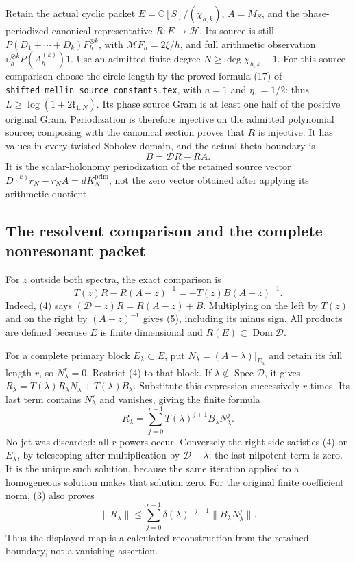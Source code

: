 Retain the actual cyclic packet
\(E=\mathbb C[S]/(\chi_{h,k})\), \(A=M_S\), and the
phase-periodized canonical representative \(R:E\to\mathscr H\).
Its source is still
\(P(D_1+\cdots+D_k)F_h^{\otimes k}\), with
\(\mathcal MF_h=2\xi/h\), and full arithmetic observation
\(\upsilon_h^{\otimes k}P(A_h^{(k)})1\).
Use an admitted finite degree \(N\ge\deg\chi_{h,k}-1\). For this
source comparison choose the circle length by the proved formula
(17) of \texttt{shifted\_\allowbreak{}mellin\_\allowbreak{}source\_\allowbreak{}constants.tex}, with
\(a=1\) and \(\eta_1=1/2\): thus
\(L\ge\log(1+2\mathfrak k_{1,N})\). Its phase source Gram is at
least one half of the positive original Gram. Periodization is
therefore injective on the admitted polynomial source; composing
with the canonical section proves that \(R\) is injective.
It has values in every twisted Sobolev domain, and the actual theta boundary is
\[
 B=\mathscr D R-RA.
 \tag{4}
\]
It is the scalar-holonomy periodization of the retained source vector
\(D^{(k)}r_N-r_NA=dK_N^{\mathrm{prim}}\), not the zero vector
obtained after applying its arithmetic quotient.

\subsection{The resolvent comparison and the complete nonresonant packet}
For \(z\) outside both spectra, the exact comparison is
\[
 T(z)R-R(A-z)^{-1}=-T(z)B(A-z)^{-1}.
 \tag{5}
\]
Indeed, (4) says
\((\mathscr D-z)R=R(A-z)+B\). Multiplying on the left by
\(T(z)\) and on the right by \((A-z)^{-1}\) gives (5), including
its minus sign. All products are defined because \(E\) is finite
dimensional and \(R(E)\subset\operatorname{Dom}\mathscr D\).

For a complete primary block \(E_\lambda\subset E\), put
\(N_\lambda=(A-\lambda)|_{E_\lambda}\) and retain its full
length \(r\), so \(N_\lambda^r=0\). Restrict (4) to that block.
If \(\lambda\notin\operatorname{Spec}\mathscr D\), it gives
\(R_\lambda=T(\lambda)R_\lambda N_\lambda+T(\lambda)B_\lambda\).
Substitute this expression successively \(r\) times. Its last
term contains \(N_\lambda^r\) and vanishes, giving the finite formula
\[
 \boxed{R_\lambda=
 \sum_{j=0}^{r-1}T(\lambda)^{j+1}B_\lambda N_\lambda^j.}
 \tag{6}
\]
No jet was discarded: all \(r\) powers occur. Conversely the right
side satisfies (4) on \(E_\lambda\), by telescoping after
multiplication by \(\mathscr D-\lambda\); the last nilpotent term
is zero. It is the unique such solution, because the same iteration
applied to a homogeneous solution makes that solution zero.
For the original finite coefficient norm, (3) also proves
\[
 \|R_\lambda\|
 \le\sum_{j=0}^{r-1}\delta(\lambda)^{-j-1}
                     \|B_\lambda N_\lambda^j\|.
 \tag{7}
\]
Thus the displayed map is a calculated reconstruction from the
retained boundary, not a vanishing assertion.

